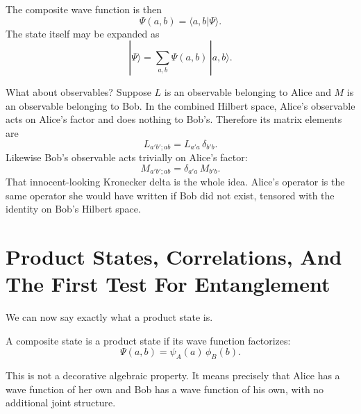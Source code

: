The composite wave function is then
\begin{equation}
\Psi(a,b)=\langle a,b|\Psi\rangle.
\end{equation}
The state itself may be expanded as
\begin{equation}
|\Psi\rangle=\sum_{a,b}\Psi(a,b)\,|a,b\rangle.
\end{equation}

What about observables? Suppose $L$ is an observable belonging to Alice and $M$ is an observable belonging to Bob. In the combined Hilbert space, Alice's observable acts on Alice's factor and does nothing to Bob's. Therefore its matrix elements are
\begin{equation}
L_{a'b';ab}=L_{a'a}\,\delta_{b'b}.
\end{equation}
Likewise Bob's observable acts trivially on Alice's factor:
\begin{equation}
M_{a'b';ab}=\delta_{a'a}\,M_{b'b}.
\end{equation}
That innocent-looking Kronecker delta is the whole idea. Alice's operator is the same operator she would have written if Bob did not exist, tensored with the identity on Bob's Hilbert space.

\section{Product States, Correlations, And The First Test For Entanglement}

We can now say exactly what a product state is.

\begin{definition}
A composite state is a product state if its wave function factorizes:
\begin{equation}
\Psi(a,b)=\psi_A(a)\,\phi_B(b).
\end{equation}
\end{definition}

This is not a decorative algebraic property. It means precisely that Alice has a wave function of her own and Bob has a wave function of his own, with no additional joint structure.

